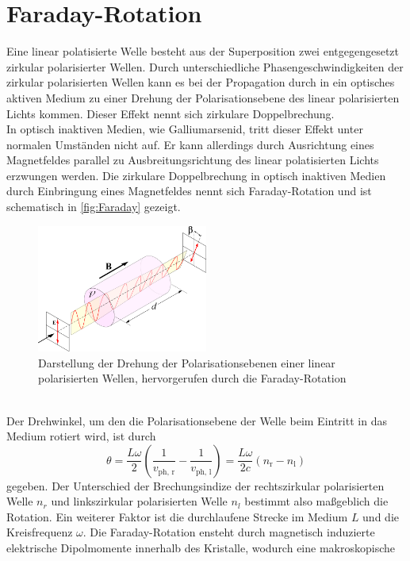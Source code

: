 \section{Faraday-Rotation}

Eine linear polatisierte Welle besteht aus der Superposition zwei entgegengesetzt zirkular polarisierter Wellen. Durch unterschiedliche Phasengeschwindigkeiten der zirkular polarisierten Wellen
kann es bei der Propagation durch in ein optisches aktiven Medium zu einer Drehung der Polarisationsebene des linear polarisierten Lichts kommen. Dieser Effekt nennt sich zirkulare Doppelbrechung.\\
In optisch inaktiven Medien, wie Galliumarsenid, tritt dieser Effekt unter normalen Umständen nicht auf. Er kann allerdings durch Ausrichtung eines Magnetfeldes parallel zu Ausbreitungsrichtung des 
linear polatisierten Lichts erzwungen werden. Die zirkulare Doppelbrechung in optisch inaktiven Medien durch Einbringung eines Magnetfeldes nennt sich Faraday-Rotation und ist schematisch in \autoref{fig:Faraday} gezeigt.
\begin{figure}
    \centering
    \includegraphics[width = 0.5\textwidth]{content/V46_pictures/Faraday.png}
    \caption{Darstellung der Drehung der Polarisationsebenen einer linear polarisierten Wellen, hervorgerufen durch die Faraday-Rotation \cite{wiki_Fara}}
    \label{fig:Faraday}
\end{figure}
\\Der Drehwinkel, um den die Polarisationsebene der Welle beim Eintritt in das Medium rotiert wird, ist durch
\begin{equation}
    \label{eq:theta}
    \theta = \frac{L\omega}{2}\left(\frac{1}{v_{\text{ph, r}}} - \frac{1}{v_{\text{ph, l}}}\right) = \frac{L\omega}{2c}\left(n_{\text{r}} - n_{\text{l}}\right)
\end{equation}
gegeben. Der Unterschied der Brechungsindize der rechtszirkular polarisierten Welle $n_r$ und linkszirkular polarisierten Welle $n_l$ bestimmt also maßgeblich die Rotation. Ein weiterer
Faktor ist die durchlaufene Strecke im Medium $L$ und die Kreisfrequenz $\omega$. Die Faraday-Rotation ensteht durch magnetisch induzierte elektrische Dipolmomente innerhalb des Kristalle, wodurch eine makroskopische

